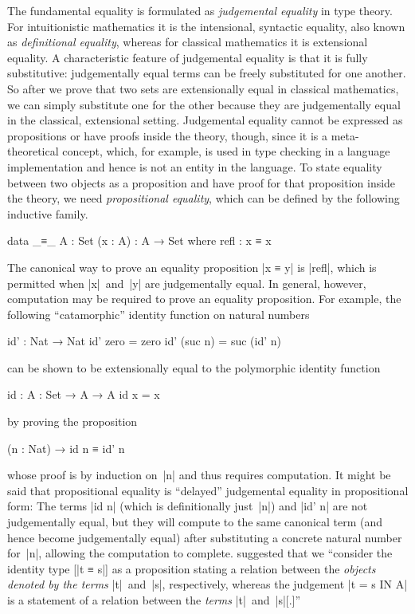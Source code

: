 The fundamental equality is formulated as \emph{judgemental equality} in type theory.
For intuitionistic mathematics it is the intensional, syntactic equality, also known as \emph{definitional equality}, whereas for classical mathematics it is extensional equality.
A characteristic feature of judgemental equality is that it is fully substitutive: judgementally equal terms can be freely substituted for one another.
So after we prove that two sets are extensionally equal in classical mathematics, we can simply substitute one for the other because they are judgementally equal in the classical, extensional setting.
Judgemental equality cannot be expressed as propositions or have proofs inside the theory, though, since it is a meta-theoretical concept, which, for example, is used in type checking in a language implementation and hence is not an entity in the language.
To state equality between two objects as a proposition and have proof for that proposition inside the theory, we need \emph{propositional equality}, which can be defined by the following inductive family.
\begin{code}
data _≡_ {A : Set} (x : A) : A → Set where
  refl : x ≡ x
\end{code}
The canonical way to prove an equality proposition |x ≡ y| is |refl|, which is permitted when |x|~and~|y| are judgementally equal.
In general, however, computation may be required to prove an equality proposition. For example, the following ``catamorphic'' identity function on natural numbers
\begin{code}
id' : Nat → Nat
id' zero     = zero
id' (suc n)  = suc (id' n)
\end{code}
can be shown to be extensionally equal to the polymorphic identity function
\begin{code}
id : {A : Set} → A → A
id x = x
\end{code}
by proving the proposition
\begin{code}
(n : Nat) → id n ≡ id' n
\end{code}
whose proof is by induction on~|n| and thus requires computation.
It might be said that propositional equality is ``delayed'' judgemental equality in propositional form: The terms |id n| (which is definitionally just~|n|) and |id' n| are not judgementally equal, but they will compute to the same canonical term (and hence become judgementally equal) after substituting a concrete natural number for~|n|, allowing the computation to complete.
\citet[page~19]{Streicher-ITT} suggested that we ``consider the identity type [|t ≡ s|] as a proposition stating a relation between the \emph{objects denoted by the terms} |t|~and~|s|, respectively, whereas the judgement |t = s IN A| is a statement of a relation between the \emph{terms} |t|~and~|s|[.]''
